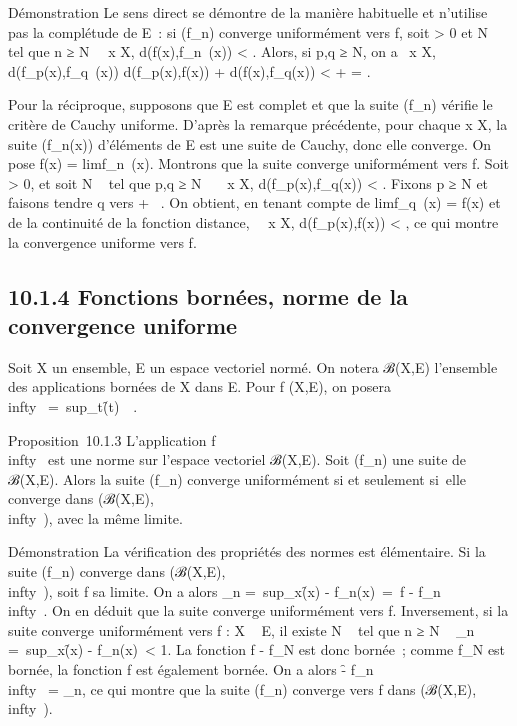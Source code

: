 \documentclass[]{article}
\begin{document}
Démonstration Le sens direct se démontre de la manière habituelle et
n'utilise pas la complétude de E~: si (f_n) converge
uniformément vers f, soit \epsilon > 0 et N \in {}~ tel que n ≥ N
\rigtharrow~\forall~x \in X, d(f(x),f_n~(x)) <
\epsilon {} . Alors, si p,q ≥ N, on a
\forall~x \in X, d(f_p(x),f_q~(x)) \leq
d(f_p(x),f(x)) + d(f(x),f_q(x)) < \epsilon
{} + \epsilon {} = \epsilon.

Pour la réciproque, supposons que E est complet et que la suite
(f_n) vérifie le critère de Cauchy uniforme. D'après la
remarque précédente, pour chaque x \in X, la suite (f_n(x))
d'éléments de E est une suite de Cauchy, donc elle converge. On pose
f(x) = limf_n~(x). Montrons que la
suite converge uniformément vers f. Soit \epsilon > 0, et soit N \in
{}~ tel que p,q ≥ N \rigtharrow~\forall~~x \in X,
d(f_p(x),f_q(x)) < \epsilon {} . Fixons p ≥ N et faisons tendre q vers + \infty~. On obtient, en tenant
compte de limf_q~(x) = f(x) et de la
continuité de la fonction distance, \forall~~x \in X,
d(f_p(x),f(x)) \leq \epsilon {} < \epsilon, ce
qui montre la convergence uniforme vers f.

\subsection{10.1.4 Fonctions bornées, norme de la convergence uniforme}

Soit X un ensemble, E un espace vectoriel normé. On notera ℬ(X,E)
l'ensemble des applications bornées de X dans E. Pour f (X,E), on
posera \f\\infty~
=\
sup_t\inX\f(t)\
\in {}~.

Proposition~10.1.3 L'application
f\mapsto~\f\\infty~
est une norme sur l'espace vectoriel ℬ(X,E). Soit (f_n) une
suite de ℬ(X,E). Alors la suite (f_n) converge uniformément si
et seulement si~elle converge dans (ℬ(X,E),\
\\infty~), avec la même limite.

Démonstration La vérification des propriétés des normes est élémentaire.
Si la suite (f_n) converge dans
(ℬ(X,E),\ \\infty~), soit f
sa limite. On a alors \mu_n =\
sup_x\inX\f(x) -
f_n(x)\ =\ f
- f_n\\infty~. On en déduit que la suite
converge uniformément vers f. Inversement, si la suite converge
uniformément vers f : X \rightarrow~ E, il existe N \in {}~ tel que n ≥ N \rigtharrow~
\mu_n =\
sup_x\inX\f(x) -
f_n(x)\ < 1. La fonction f -
f_N est donc bornée~; comme f_N est bornée, la
fonction f est également bornée. On a alors \f
- f_n\\infty~ = \mu_n, ce qui montre
que la suite (f_n) converge vers f dans
(ℬ(X,E),\ \\infty~).
\end{document}
